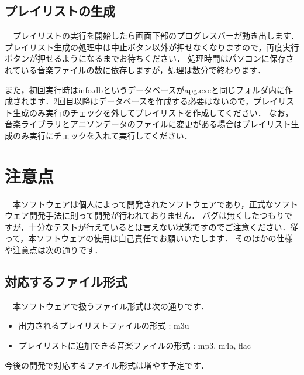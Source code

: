 \documentclass[10pt]{ujarticle}
\begin{document}
\subsection{プレイリストの生成}
　プレイリストの実行を開始したら画面下部のプログレスバーが動き出します．プレイリスト生成の処理中は中止ボタン以外が押せなくなりますので，再度実行ボタンが押せるようになるまでお待ちください．
処理時間はパソコンに保存されている音楽ファイルの数に依存しますが，処理は数分で終わります．
\par また，初回実行時はinfo.dbというデータベースがapg.exeと同じフォルダ内に作成されます．2回目以降はデータベースを作成する必要はないので，プレイリスト生成のみ実行のチェックを外してプレイリストを作成してください．
なお，音楽ライブラリとアニソンデータのファイルに変更がある場合はプレイリスト生成のみ実行にチェックを入れて実行してください．


\section{注意点}
　本ソフトウェアは個人によって開発されたソフトウェアであり，正式なソフトウェア開発手法に則って開発が行われておりません．
バグは無くしたつもりですが，十分なテストが行えているとは言えない状態ですのでご注意ください．従って，本ソフトウェアの使用は自己責任でお願いいたします．
そのほかの仕様や注意点は次の通りです．

\subsection{対応するファイル形式}
　本ソフトウェアで扱うファイル形式は次の通りです．
\begin{itemize}
    \item 出力されるプレイリストファイルの形式 : m3u
    \item プレイリストに追加できる音楽ファイルの形式 : mp3, m4a, flac
\end{itemize}
\par 今後の開発で対応するファイル形式は増やす予定です．
\end{document}
